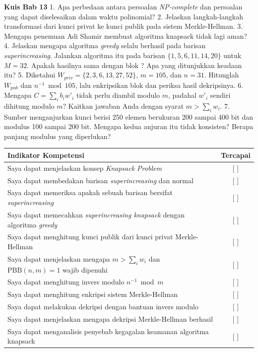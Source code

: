 
\begin{obeassessment}
\textbf{Kuis Bab 13}
1. Apa perbedaan antara persoalan \textit{NP-complete} dan persoalan yang dapat
   diselesaikan dalam waktu polinomial?
2. Jelaskan langkah-langkah transformasi dari kunci privat ke kunci publik pada
   sistem Merkle-Hellman.
3. Mengapa penemuan Adi Shamir membuat algoritma knapsack tidak lagi aman?
4. Jelaskan mengapa algoritma \textit{greedy} selalu berhasil pada barisan
   \textit{superincreasing}. Jalankan algoritma itu pada barisan
   $\{1, 5, 6, 11, 14, 20\}$ untuk $M = 32$. Apakah hasilnya sama dengan blok
   ? Apa yang ditunjukkan keadaan itu?
5. Diketahui $W_{priv} = \{2, 3, 6, 13, 27, 52\}$, $m = 105$, dan $n = 31$.
   Hitunglah $W_{pub}$ dan $n^{-1} \bmod 105$, lalu enkripsikan blok
    dan periksa hasil dekripsinya.
6. Mengapa $C = \sum_i b_i w'_i$ tidak perlu diambil modulo $m$, padahal
   $w'_i$ sendiri dihitung modulo $m$? Kaitkan jawaban Anda dengan syarat
   $m > \sum_i w_i$.
7. Sumber menganjurkan kunci berisi 250 elemen berukuran 200 sampai 400 bit
   dan modulus 100 sampai 200 bit. Mengapa kedua anjuran itu tidak konsisten?
   Berapa panjang modulus yang diperlukan?
\end{obeassessment}
\begin{competencychecklist}
\begin{tabularx}{\linewidth}{|X|c|}
\hline
Indikator Kompetensi & Tercapai \\
\hline
Saya dapat menjelaskan konsep \textit{Knapsack Problem} & [ ] \\
\hline
Saya dapat membedakan barisan \textit{superincreasing} dan normal & [ ] \\
\hline
Saya dapat memeriksa apakah sebuah barisan bersifat \textit{superincreasing} & [ ] \\
\hline
Saya dapat memecahkan \textit{superincreasing knapsack} dengan algoritma \textit{greedy} & [ ] \\
\hline
Saya dapat menghitung kunci publik dari kunci privat Merkle-Hellman & [ ] \\
\hline
Saya dapat menjelaskan mengapa $m > \sum_i w_i$ dan $\text{PBB}(n,m)=1$ wajib dipenuhi & [ ] \\
\hline
Saya dapat menghitung invers modulo $n^{-1} \bmod m$ & [ ] \\
\hline
Saya dapat menghitung enkripsi sistem Merkle-Hellman & [ ] \\
\hline
Saya dapat melakukan dekripsi dengan bantuan invers modulo & [ ] \\
\hline
Saya dapat menjelaskan mengapa dekripsi Merkle-Hellman berhasil & [ ] \\
\hline
Saya dapat menganalisis penyebab kegagalan keamanan algoritma knapsack & [ ] \\
\hline
\end{tabularx}
\end{competencychecklist}

